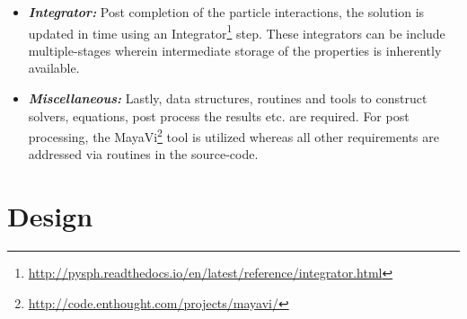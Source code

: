 \begin{itemize}
\item \textbf{\textit{Integrator: }}Post completion of the particle interactions, the solution is updated in time using an Integrator\footnote[5]{\url{http://pysph.readthedocs.io/en/latest/reference/integrator.html}} step. These integrators can be include multiple-stages wherein intermediate storage of the properties is inherently available. 

\item \textbf{\textit{Miscellaneous: }}Lastly, data structures, routines and tools to construct solvers, equations, post process the results etc. are required. For post processing, the MayaVi\footnote[6]{\url{http://code.enthought.com/projects/mayavi/}} tool is utilized whereas all other requirements are addressed via routines in the source-code.
\end{itemize} 

\section{Design}


